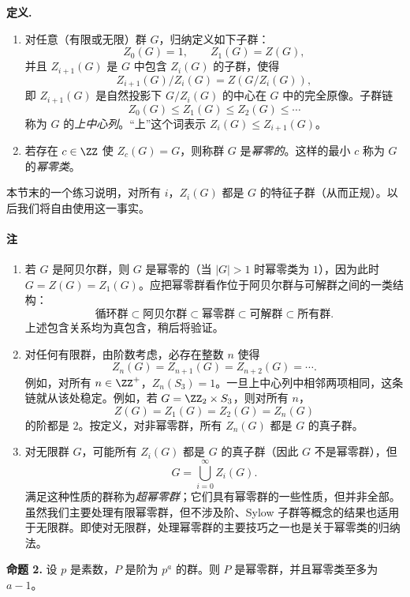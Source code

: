 \medskip
\noindent\textbf{定义.}
\begin{enumerate}[label=(\arabic*)]
  \item 对任意（有限或无限）群 $G$，归纳定义如下子群：
  \[
    Z_0(G)=1,
    \qquad
    Z_1(G)=Z(G),
  \]
  并且 $Z_{i+1}(G)$ 是 $G$ 中包含 $Z_i(G)$ 的子群，使得
  \[
    Z_{i+1}(G)/Z_i(G)=Z(G/Z_i(G)),
  \]
  即 $Z_{i+1}(G)$ 是自然投影下 $G/Z_i(G)$ 的中心在 $G$ 中的完全原像。子群链
  \[
    Z_0(G)\leq Z_1(G)\leq Z_2(G)\leq\cdots
  \]
  称为 $G$ 的\emph{上中心列}。“上”这个词表示 $Z_i(G)\leq Z_{i+1}(G)$。
  \item 若存在 $c\in\ZZ$ 使 $Z_c(G)=G$，则称群 $G$ 是\emph{幂零的}。这样的最小 $c$ 称为 $G$ 的\emph{幂零类}。
\end{enumerate}

本节末的一个练习说明，对所有 $i$，$Z_i(G)$ 都是 $G$ 的特征子群（从而正规）。以后我们将自由使用这一事实。

\paragraph{注}
\begin{enumerate}[label=(\arabic*)]
  \item 若 $G$ 是阿贝尔群，则 $G$ 是幂零的（当 $|G|>1$ 时幂零类为 $1$），因为此时 $G=Z(G)=Z_1(G)$。应把幂零群看作位于阿贝尔群与可解群之间的一类结构：
  \[
    \text{循环群}\subset \text{阿贝尔群}\subset \text{幂零群}\subset \text{可解群}\subset \text{所有群}.
  \]
  上述包含关系均为真包含，稍后将验证。

  \item 对任何有限群，由阶数考虑，必存在整数 $n$ 使得
  \[
    Z_n(G)=Z_{n+1}(G)=Z_{n+2}(G)=\cdots.
  \]
  例如，对所有 $n\in\ZZ^+$，$Z_n(S_3)=1$。一旦上中心列中相邻两项相同，这条链就从该处稳定。例如，若 $G=\ZZ_2\times S_3$，则对所有 $n$，
  \[
    Z(G)=Z_1(G)=Z_2(G)=Z_n(G)
  \]
  的阶都是 $2$。按定义，对非幂零群，所有 $Z_n(G)$ 都是 $G$ 的真子群。

  \item 对无限群 $G$，可能所有 $Z_i(G)$ 都是 $G$ 的真子群（因此 $G$ 不是幂零群），但
  \[
    G=\bigcup_{i=0}^{\infty} Z_i(G).
  \]
  满足这种性质的群称为\emph{超幂零群}；它们具有幂零群的一些性质，但并非全部。虽然我们主要处理有限幂零群，但不涉及阶、Sylow 子群等概念的结果也适用于无限群。即使对无限群，处理幂零群的主要技巧之一也是关于幂零类的归纳法。
\end{enumerate}

\medskip
\noindent\textbf{命题 2.} 设 $p$ 是素数，$P$ 是阶为 $p^a$ 的群。则 $P$ 是幂零群，并且幂零类至多为 $a-1$。

